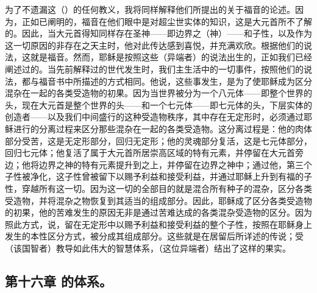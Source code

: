 为了不遗漏这（）的任何教义，我将同样解释他们所提出的关于福音的论述。因为，正如已阐明的，福音在他们眼中是对超尘世实体的知识，这是大元首所不了解的。因此，当大元首得知同样存在圣神——即边界之（神）——和子性，以及作为这一切原因的非存在之天主时，他对此传达感到喜悦，并充满欢欣。根据他们的说法，这就是福音。然而，耶稣是按照这些（异端者）的说法出生的，正如我们已经阐述过的。当先前解释过的世代发生时，我们主生活中的一切事件，按照他们的说法，都与福音书中所描述的方式相同。他说，这些事发生，是为了使耶稣成为区分混杂在一起的各类受造物的初果。因为当世界被分为一个八元体——即整个世界的头，现在大元首是整个世界的头——和一个七元体——即七元体的头，下层实体的创造者——以及我们中间盛行的这种受造物秩序，其中存在无定形时，必须通过耶稣进行的分离过程来区分那些混杂在一起的各类受造物。这分离过程是：他的肉体部分受苦，这是无定形部分，回归无定形；他的灵魂部分复活，这是七元体部分，回归七元体；他复活了属于大元首所居崇高区域的特有元素，并停留在大元首旁边；他将边界之神的特有元素提升到之上，并停留在边界之神中；通过他，第三个子性被净化，这子性曾被留下以赐予利益和接受利益，并通过耶稣上升到有福的子性，穿越所有这一切。因为这一切的全部目的就是混合所有种子的混杂，区分各类受造物，并将混杂之物恢复到其适当的组成部分。因此，耶稣成了区分各类受造物的初果，他的苦难发生的原因无非是通过苦难达成的各类混杂受造物的区分。因为照此方式，说，留在无定形中以赐予利益和接受利益的整个子性，按照在耶稣身上发生的本性区分方式，被分成其组成部分。这些就是在居留后所详述的传说；受（该国智者）教导如此伟大的智慧体系，（这位异端者）结出了这样的果实。\par


\subsection{第十六章 的体系。}

